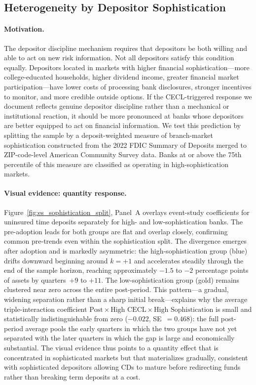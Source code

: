 \subsection{Heterogeneity by Depositor Sophistication}
\label{sec:results:sophistication}

\paragraph{Motivation.}
The depositor discipline mechanism requires that depositors be both willing and
able to act on new risk information. Not all depositors satisfy this condition
equally. Depositors located in markets with higher financial sophistication---more
college-educated households, higher dividend income, greater financial market
participation---have lower costs of processing bank disclosures, stronger
incentives to monitor, and more credible outside options. If the CECL-triggered
response we document reflects genuine depositor discipline rather than a
mechanical or institutional reaction, it should be more pronounced at banks whose
depositors are better equipped to act on financial information. We test this
prediction by splitting the sample by a deposit-weighted measure of branch-market
sophistication constructed from the 2022 FDIC Summary of Deposits merged to
ZIP-code-level American Community Survey data. Banks at or above the 75th
percentile of this measure are classified as operating in high-sophistication
markets.

\paragraph{Visual evidence: quantity response.}
Figure~\ref{fig:es_sophistication_split}, Panel~A overlays event-study
coefficients for uninsured time deposits separately for high- and
low-sophistication banks. The pre-adoption leads for both groups are flat and
overlap closely, confirming common pre-trends even within the sophistication
split. The divergence emerges after adoption and is markedly asymmetric: the
high-sophistication group (blue) drifts downward beginning around $k=+1$ and
accelerates steadily through the end of the sample horizon, reaching
approximately $-1.5$ to $-2$ percentage points of assets by quarters~$+9$ to
$+11$. The low-sophistication group (gold) remains clustered near zero across the
entire post-period. This pattern---a gradual, widening separation rather than a
sharp initial break---explains why the average triple-interaction coefficient
$\text{Post} \times \text{High CECL} \times \text{High Sophistication}$ is small
and statistically indistinguishable from zero ($-0.022$, SE~$=0.468$): the full
post-period average pools the early quarters in which the two groups have not yet
separated with the later quarters in which the gap is large and economically
substantial. The visual evidence thus points to a quantity effect that is
concentrated in sophisticated markets but that materializes gradually, consistent
with sophisticated depositors allowing CDs to mature before redirecting funds
rather than breaking term deposits at a cost.

